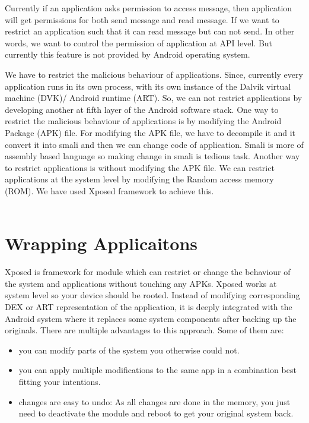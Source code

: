 Currently if an application asks permission to access message, then application will get permissions for both send message and read message. If we want to restrict an application such that it can read message but can not send. In other words, we want to control the permission of application at API level. But currently this feature is not provided by Android operating system.

We have to restrict the malicious behaviour of applications. Since, currently every application runs in its own process, with its own instance of the Dalvik virtual machine (DVK)/ Android runtime (ART). So, we can not restrict applications by developing another at fifth layer of the Android software stack. One way to restrict the malicious behaviour of applications is by modifying the Android Package (APK) file. For modifying the APK file, we have to decompile it and it convert it into smali and then we can change code of application. Smali is more of assembly based language so making change in smali is tedious task. Another way to restrict applications is without modifying the APK file. We can restrict applications at the system level by modifying the Random access memory (ROM). We have used Xposed framework \cite{xposedframework} to achieve this.\\ \\
\section{Wrapping Applicaitons}
Xposed is framework for module which can restrict or change the behaviour of the system and applications without touching any APKs. Xposed works at system level so your device should be rooted. Instead of modifying corresponding DEX or ART representation of the application, it is deeply integrated with the Android system where it replaces some system components after backing up the originals. There are multiple advantages to this approach. Some of them are:
\begin{itemize}
    \item you can modify parts of the system you otherwise could not.
    \item you can apply multiple modifications to the same app in a combination best fitting your intentions.
    \item changes are easy to undo: As all changes are done in the memory, you just need to deactivate the module and reboot to get your original system back.
\end{itemize}

